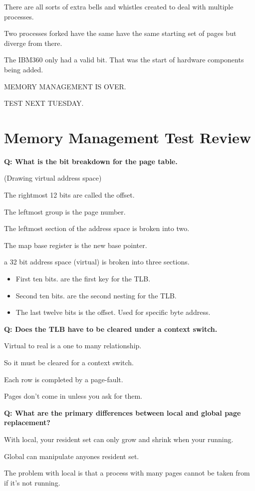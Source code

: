 \documentclass{article}
\begin{document}
There are all sorts of extra bells and whistles created to deal with multiple processes.

Two processes forked have the same have the same starting set of pages but diverge from there.

The IBM360 only had a valid bit. That was the start of hardware components being added.

MEMORY MANAGEMENT IS OVER.

TEST NEXT TUESDAY.

\section*{Memory Management Test Review}

{\bf Q: What is the bit breakdown for the page table.}

(Drawing virtual address space)

The rightmost 12 bits are called the offset.

The leftmost group is the page number.

The leftmost section of the address space is broken into two.

The map base register is the new base pointer.

a 32 bit address space (virtual) is broken into three sections.
\begin{itemize}
\item First ten bits. are the first key for the TLB.
\item Second ten bits. are the second nesting for the TLB.
\item The last twelve bits is the offset. Used for specific byte address.
\end{itemize}

{\bf Q: Does the TLB have to be cleared under a context switch.}

Virtual to real is a one to many relationship.

So it must be cleared for a context switch.

Each row is completed by a page-fault.

Pages don't come in unless you ask for them.

{\bf Q: What are the primary differences between local and global page replacement?}

With local, your resident set can only grow and shrink when your running.

Global can manipulate anyones resident set.

The problem with local is that a process with many pages cannot be taken from if it's not running.
\end{document}
